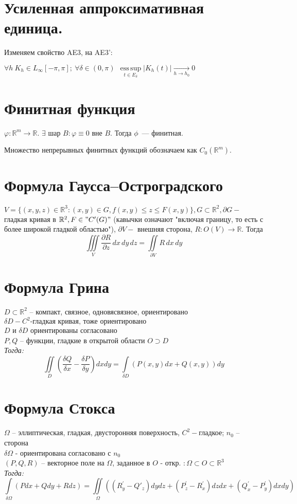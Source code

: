\documentclass[paper=a4, fontsize=14pt]{article}
\DeclareMathOperator*{\esssup}{ess\, sup}
\begin{document}
\section{Усиленная аппроксимативная единица.}

Изменяем свойство AE3, на AE3': 

$ \forall h ~ K_h \in L_\infty[-\pi, \pi]; ~ \forall \delta \in (0, \pi) ~ ~ \esssup\limits_{t \in E_\delta} |K_h(t)| \underset{h \rightarrow h_0}{\rightarrow} 0 $

\section{Финитная функция}
$\varphi : \mathbb{R}^m \rightarrow \mathbb{R}$. $\exists$ шар $B: \varphi \equiv 0 $ вне $B$. Тогда $\phi$~--- финитная.

Множество непрерывных финитных функций обозначаем как $C_0(\mathbb{R}^m)$.

\section{Формула Гаусса--Остроградского}
$V = \{(x,y,z)\in \mathbb{R}^3: (x,y) \in G, f(x, y) \leq z \leq F(x,y)\}, G \subset \mathbb{R}^2, \partial G -$ гладкая кривая в $\mathbb{R}^2, F \in "C'(G)"$ (кавычки означают "включая границу, то есть с более широкой гладкой областью"), $\partial V - $ внешняя сторона, $R: O(V) \rightarrow \mathbb{R}$. Тогда
$$\iiint\limits_{V}{\frac {\partial R}{\partial z} \,dx\,dy\,dz = \iint\limits_{\partial V}{R\,dx\,dy}}$$

\section{Формула Грина}
$D \subset \mathds{R}^2$ -- компакт, связное, одновясвязное, ориентировано\\$\delta D-C^2\text{-гладкая кривая, тоже ориентировано}$\\
$D$ и $\delta D$ ориентированы согласовано \\
$P, Q$ -- функции, гладкие в открытой области $O \supset D$ \\
\emph{Тогда:} $$\iint\limits_{D}(\frac{\delta Q}{\delta x} - \frac{\delta P}{\delta y})dxdy = \int\limits_{\delta D}(P(x,y)dx + Q(x,y))dy$$

\section{Формула Стокса}
$\Omega$ -- эллиптическая, гладкая, двусторонняя поверхность, $C^2-$гладкое; $n_0$ -- сторона\\
$\delta \Omega$ - ориентирована согласовано с $n_0$\\
$(P,Q,R)$ -- векторное поле на $\Omega$, заданное в $O$ - откр. $: \Omega \subset O\subset \mathds{R}^3$ \\
\emph{Тогда:} $$\int\limits_{\delta \Omega}(Pdx + Qdy+Rdz) =
\iint\limits_{\Omega}((R^{'}_y- Q{'}_z)dydz
+(P^{'}_z-R^{'}_x)dzdx + (Q^{'}_x-P^{'}_y)dxdy)$$
\end{document}
